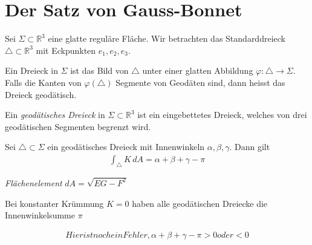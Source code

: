\documentclass[../main.tex]{subfiles}
\begin{document}
\section{Der Satz von Gauss-Bonnet}
\begin{minipage}{30em}
    Sei $\Sigma \subset \mathbb{R}^3$ eine glatte reguläre Fläche. Wir betrachten das Standarddreieck $\triangle \subset \mathbb{R}^3$ mit Eckpunkten $e_1,e_2,e_3$.
\end{minipage}
\begin{minipage}{8em}
\end{minipage}

Ein Dreieck in $\Sigma$ ist das Bild von $\triangle$ unter einer glatten Abbildung $\varphi : \triangle \to \Sigma$.
Falls die Kanten von $\varphi (\triangle)$ Segmente von Geodäten sind, dann heisst das Dreieck geodätisch.

\begin{definition}
    Ein \emph{geodätisches Dreieck} in $\Sigma \subset \mathbb{R}^3$ ist ein eingebettetes Dreieck, welches von drei geodätischen Segmenten begrenzt wird.
\end{definition}

\begin{theorem}
    Sei $\triangle \subset \Sigma$ ein geodätisches Dreieck mit Innenwinkeln $\alpha, \beta, \gamma$. Dann gilt
    \begin{align*}
        \int_{\triangle} K \,dA = \alpha + \beta + \gamma - \pi 
    \end{align*}
\end{theorem}
 
\begin{recall}
    \emph{Flächenelement} $dA = \sqrt{EG-F^{2}}$ 
\end{recall}

\begin{remark}
    Bei konstanter Krümmung $K = 0$ haben alle geodätischen Dreiecke die Innenwinkelsumme $\pi$
\end{remark}

\begin{geometric}
\end{geometric}
\begin{align*}
    Hier ist noch ein Fehler, \alpha + \beta + \gamma - \pi > 0 oder < 0
\end{align*}
\end{document}
